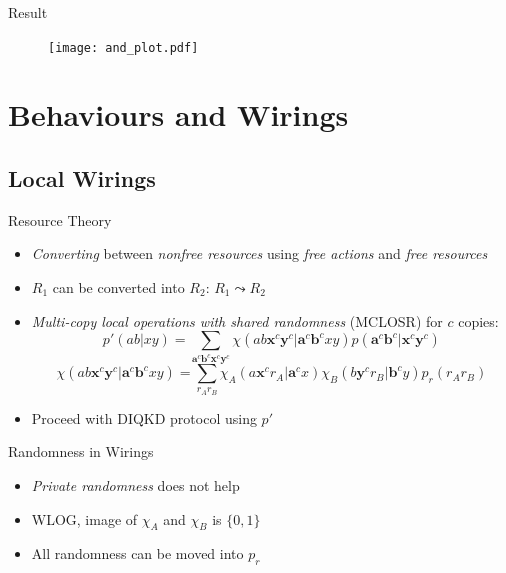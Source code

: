 \documentclass[xcolor=dvipsnames]{beamer}
\newcommand{\?}{\mathrel{?}} %
\newcommand{\cvec}[1]{\boldsymbol{\mathbf{#1}}}    %
\begin{document}
\begin{frame}{Result}
    \begin{figure}
      \texttt{[image: and\_plot.pdf]}
    \end{figure}
\end{frame}

\section{Behaviours and Wirings}

\subsection{Local Wirings}

\begin{frame}{Resource Theory}
  \begin{itemize}[<+->]
    \item \emph{Converting} between \emph{nonfree resources} using \emph{free actions} and \emph{free resources}
    \item \(R_1\) can be converted into \(R_2\): \(R_1 \leadsto R_2\)
    \item \emph{Multi-copy local operations with shared randomness} (MCLOSR) for \(c\) copies:
      \[ p'(ab|xy) = \sum_{\cvec{a}^c\cvec{b}^c\cvec{x}^c\cvec{y}^c} \chi(ab\cvec{x}^c\cvec{y}^c|\cvec{a}^c\cvec{b}^cxy) p(\cvec{a}^c\cvec{b}^c|\cvec{x}^c\cvec{y}^c) \]
      \[ \chi(ab\cvec{x}^c\cvec{y}^c|\cvec{a}^c\cvec{b}^cxy) = \sum_{r_A r_B} \chi_A(a\cvec{x}^c r_A|\cvec{a}^cx) \chi_B(b\cvec{y}^c r_B|\cvec{b}^cy) p_r(r_A r_B) \]
    \item Proceed with DIQKD protocol using \(p'\)
  \end{itemize}
\end{frame}

\begin{frame}{Randomness in Wirings}
  \begin{itemize}[<+->]
    \item \emph{Private randomness} does not help
    \item WLOG, image of \(\chi_A\) and \(\chi_B\) is \(\{0,1\}\)
    \item All randomness can be moved into \(p_r\)
  \end{itemize}
\end{frame}
\end{document}
